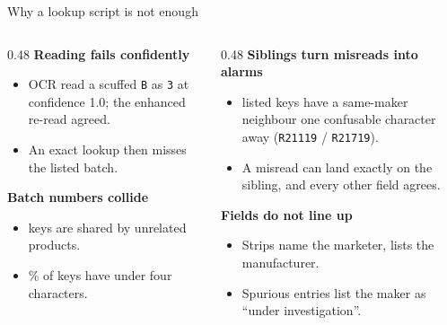 \documentclass[aspectratio=169,11pt]{beamer}
\begin{document}
\begin{frame}{Why a lookup script is not enough}
\small
\begin{columns}[T]
\begin{column}{0.48\textwidth}
\textbf{\color{teal}Reading fails confidently}
\begin{itemize}
\item OCR read a scuffed \texttt{B} as \texttt{3} at confidence 1.0; the enhanced re-read agreed.
\item An exact lookup then misses the listed batch.
\end{itemize}
\vspace{2mm}
\textbf{\color{teal}Batch numbers collide}
\begin{itemize}
\item \CollisionKeys{} keys are shared by unrelated products.
\item \ShortKeyPct\% of keys have under four characters.
\end{itemize}
\end{column}
\begin{column}{0.48\textwidth}
\textbf{\color{brick}Siblings turn misreads into alarms}
\begin{itemize}
\item \SiblingKeys{} listed keys have a same-maker neighbour one confusable character away (\texttt{R21119} / \texttt{R21719}).
\item A misread can land exactly on the sibling, and every other field agrees.
\end{itemize}
\vspace{2mm}
\textbf{\color{teal}Fields do not line up}
\begin{itemize}
\item Strips name the marketer, lists the manufacturer.
\item Spurious entries list the maker as ``under investigation''.
\end{itemize}
\end{column}
\end{columns}
\end{frame}
\end{document}
